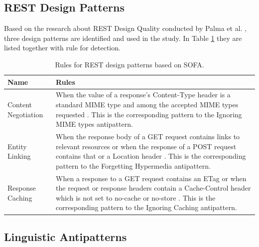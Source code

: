 \subsection{REST Design Patterns}
Based on the research about REST Design Quality conducted by Palma et al. \cite{design}, three design patterns are identified and used in the study. In Table \ref{tab:RulesforRESTdesignpatterns} they are listed together with rule for detection.

\begin{center}
\begin{table}[!ht]
\small
\begin{tabular}{|p{5cm}|p{9cm}|}
\hline \textbf{Name} & \textbf{Rules} \\
\hline 
Content Negotiation &
When the value of a response’s Content-Type header is a standard MIME type and among the accepted MIME types requested \cite{design}. This is the corresponding pattern to the Ignoring MIME types antipattern.

\\ \hline
Entity Linking &
When the response body of a GET request contains links to relevant resources or when the response of a POST request contains that or a Location header \cite{design}. This is the corresponding pattern to the Forgetting Hypermedia antipattern. 

\\ \hline
Response Caching &
When a response to a GET request contains an ETag or when the request or response headers contain a Cache-Control header which is not set to no-cache or no-store \cite{design}. This is the corresponding pattern to the  Ignoring Caching antipattern. 

\\ \hline
\end{tabular}
 \caption{Rules for REST design patterns based on SOFA.}
 \label{tab:RulesforRESTdesignpatterns}
\end{table}
\end{center}

\subsection{Linguistic Antipatterns}

